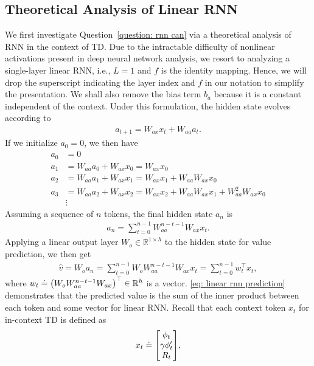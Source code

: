 \documentclass{article}
\newcommand{\R}{\mathbb{R}}
\begin{document}
\subsection{Theoretical Analysis of Linear RNN}
We first investigate Question~\ref{question: rnn can} via a theoretical analysis of RNN in the context of TD.
Due to the intractable difficulty of nonlinear activations present in deep neural network analysis, we resort to analyzing a single-layer linear RNN, i.e., $L=1$ and $f$ is the identity mapping.
Hence, we will drop the superscript indicating the layer index and $f$ in our notation to simplify the presentation.
We shall also remove the bias term $b_{a}$ because it is a constant independent of the context.
Under this formulation, the hidden state evolves according to
\begin{align}
    a_{t+1} = W_{ax} x_t + W_{aa} a_t.
\end{align}
If we initialize $a_0 = 0$, we then have
\begin{align}
    a_0 &= 0\\
    a_1 &= W_{aa} a_0 + W_{ax} x_0 = W_{ax} x_0\\
    a_2 &= W_{aa} a_1 + W_{ax} x_1 = W_{ax} x_1 + W_{aa}W_{ax} x_0\\
    a_3 &= W_{aa} a_2 + W_{ax} x_2 = W_{ax} x_2 + W_{aa}W_{ax} x_1 + W_{aa}^2W_{ax} x_0\\
    &\vdots
\end{align}
Assuming a sequence of $n$ tokens, the final hidden state $a_n$ is 
\begin{align}
    a_n = \sum_{t=0}^{n-1} W_{aa}^{n-t-1} W_{ax} x_t.
\end{align}
Applying a linear output layer $W_o \in \R^{1 \times h}$ to the hidden state for value prediction, we then get
\begin{align}
\label{eq: linear rnn prediction}
    \hat{v} = W_o a_n = \sum_{t=0}^{n-1} W_o W_{aa}^{n-t-1} W_{ax} x_t 
    = \sum_{t=0}^{n-1} w_t^\top x_t,
\end{align}
where $w_t \doteq \qty(W_o W_{aa}^{n-t-1} W_{ax})^\top \in \R^h$ is a vector.
\eqref{eq: linear rnn prediction} demonstrates that the predicted value is the sum of the inner product between each token and some vector for linear RNN.
Recall that each context token $x_t$ for in-context TD is defined as
\begin{align}
    x_t \doteq \mqty[\phi_t\\\gamma\phi'_t\\R_t],
\end{align}
\end{document}

